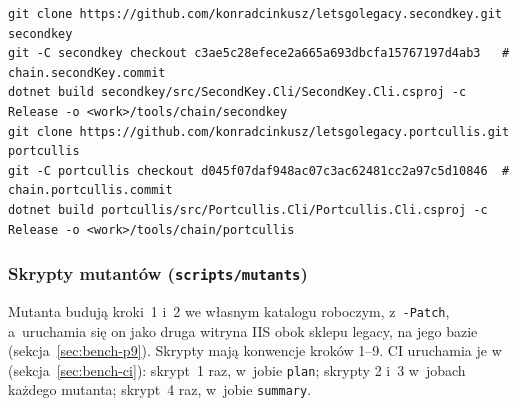 \begin{lstlisting}
git clone https://github.com/konradcinkusz/letsgolegacy.secondkey.git secondkey
git -C secondkey checkout c3ae5c28efece2a665a693dbcfa15767197d4ab3   # chain.secondKey.commit
dotnet build secondkey/src/SecondKey.Cli/SecondKey.Cli.csproj -c Release -o <work>/tools/chain/secondkey
git clone https://github.com/konradcinkusz/letsgolegacy.portcullis.git portcullis
git -C portcullis checkout d045f07daf948ac07c3ac62481cc2a97c5d10846  # chain.portcullis.commit
dotnet build portcullis/src/Portcullis.Cli/Portcullis.Cli.csproj -c Release -o <work>/tools/chain/portcullis
\end{lstlisting}


\subsubsection{Skrypty mutantów (\texttt{scripts/mutants})}\label{sec:bench-skrypty-mutanty}

Mutanta budują kroki~1 i~2 we własnym katalogu roboczym, z~\texttt{-Patch}, a~uruchamia się on
jako druga witryna IIS obok sklepu legacy, na jego bazie (sekcja~\ref{sec:bench-p9}). Skrypty
mają konwencje kroków 1--9. CI uruchamia je w~ (sekcja~\ref{sec:bench-ci}):
skrypt~1 raz, w~jobie \texttt{plan}; skrypty 2 i~3 w~jobach każdego mutanta; skrypt~4 raz,
w~jobie \texttt{summary}.

